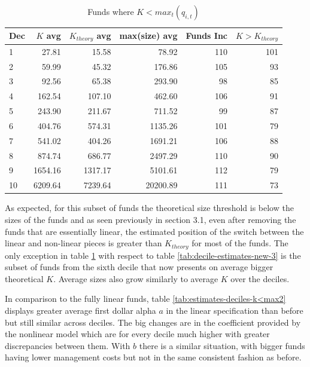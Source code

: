 \documentclass[12pt]{article}
\begin{document}
\begin{table}[H]
    \centering
    \caption{Funds where $K<max_t(q_{i,t})$}
    \label{tab:estimates-deciles-k<max1}
    \begin{tabular}{lrrrrr}
        \toprule
        Dec & $K$ avg & $K_{theory}$ avg & max(size) avg & Funds Inc & $K>K_{theory}$ \\
        \midrule
        1 & 27.81 & 15.58 & 78.92 & 110 & 101 \\
        2 & 59.99 & 45.32 & 176.86 & 105 & 93 \\
        3 & 92.56 & 65.38 & 293.90 & 98 & 85 \\
        4 & 162.54 & 107.10 & 462.60 & 106 & 91 \\
        5 & 243.90 & 211.67 & 711.52 & 99 & 87 \\
        6 & 404.76 & 574.31 & 1135.26 & 101 & 79 \\
        7 & 541.02 & 404.26 & 1691.21 & 106 & 88 \\
        8 & 874.74 & 686.77 & 2497.29 & 110 & 90 \\
        9 & 1654.16 & 1317.17 & 5101.61 & 112 & 79 \\
        10 & 6209.64 & 7239.64 & 20200.89 & 111 & 73 \\
        \bottomrule
    \end{tabular}
\end{table}


As expected, for this subset of funds the theoretical size threshold is below the sizes of the funds and as seen previously in section 3.1, even after removing the funds that are essentially linear, the estimated position of the switch between the linear and non-linear pieces is greater than $K_{theory}$ for most of the funds. The only exception in table \ref{tab:estimates-deciles-k<max1} with respect to table \ref{tab:decile-estimates-new-3} is the subset of funds from the sixth decile that now presents on average bigger theoretical $K$. Average sizes also grow similarly to average $K$ over the deciles. 


\par In comparison to the fully linear funds, table \ref{tab:estimates-deciles-k<max2} displays greater average first dollar alpha $a$ in the linear specification than before but still similar across deciles. The big changes are in the coefficient provided by the nonlinear model which are for every decile much higher with greater discrepancies between them. With $b$ there is a similar situation, with bigger funds having lower management costs but not in the same consistent fashion as before.
\end{document}
